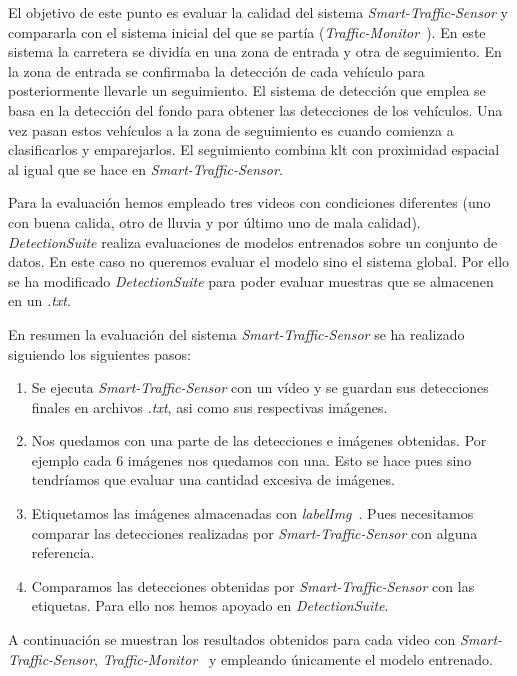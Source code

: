 El objetivo de este punto es evaluar la calidad del sistema \textit{Smart-Traffic-Sensor} y compararla con el sistema inicial del que se partía (\textit{Traffic-Monitor}~\cite{redo_tesis}). En este sistema la carretera se dividía en una zona de entrada y otra de seguimiento. En la zona de entrada se confirmaba la detección de cada vehículo para posteriormente llevarle un seguimiento.  El sistema de detección que emplea se  basa en la detección del fondo para obtener las detecciones de los vehículos. Una vez pasan estos vehículos a la zona de seguimiento es cuando comienza a clasificarlos y emparejarlos. El seguimiento combina \acrshort{klt} con proximidad espacial al igual que se hace en \textit{Smart-Traffic-Sensor}.

Para la evaluación hemos empleado tres videos con condiciones diferentes (uno con buena calida, otro de lluvia y por último uno de mala calidad). \textit{DetectionSuite} realiza evaluaciones de modelos entrenados sobre un conjunto de datos. En este caso no queremos evaluar el modelo sino el sistema global. Por ello se ha modificado \textit{DetectionSuite} para poder evaluar muestras que se almacenen en un \textit{.txt}. 

En resumen la evaluación del sistema \textit{Smart-Traffic-Sensor} se ha realizado siguiendo los siguientes pasos:

\begin{enumerate}
    \item Se ejecuta \textit{Smart-Traffic-Sensor} con un vídeo y se guardan sus detecciones finales en archivos \textit{.txt}, asi como sus respectivas imágenes.
    \item Nos quedamos con una parte de las detecciones e imágenes obtenidas. Por ejemplo cada 6 imágenes nos quedamos con una. Esto se hace pues sino tendríamos que evaluar una cantidad excesiva de imágenes.
    \item Etiquetamos las imágenes almacenadas con \textit{labelImg}~\cite{labelimg}. Pues necesitamos comparar las detecciones realizadas por \textit{Smart-Traffic-Sensor} con alguna referencia.
    \item Comparamos las detecciones obtenidas por \textit{Smart-Traffic-Sensor} con las etiquetas. Para ello nos hemos apoyado en \textit{DetectionSuite}.
\end{enumerate}


A continuación se muestran los resultados obtenidos para cada video con \textit{Smart-Traffic-Sensor}, \textit{Traffic-Monitor}~\cite{redo_tesis} y empleando únicamente el modelo entrenado.

